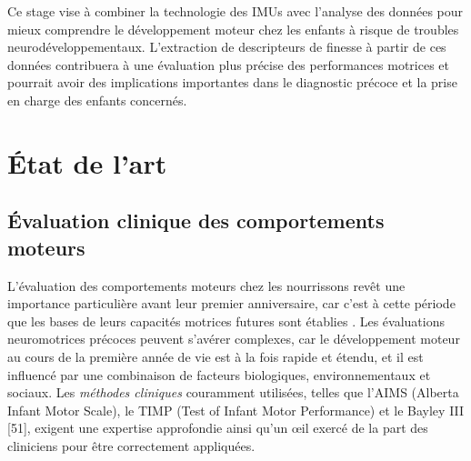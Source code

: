 \documentclass[5pt]{article}
\begin{document}
Ce stage vise à combiner la technologie des IMUs avec l'analyse des données pour mieux comprendre le développement moteur chez les enfants à risque de troubles neurodéveloppementaux. L'extraction de descripteurs de finesse à partir de ces données contribuera à une évaluation plus précise des performances motrices et pourrait avoir des implications importantes dans le diagnostic précoce et la prise en charge des enfants concernés.


\newpage
\section{État de l'art}
\subsection{Évaluation clinique des comportements moteurs}
\label{subsec: assess_sensor}

\par L'évaluation des comportements moteurs chez les nourrissons revêt une importance particulière avant leur premier anniversaire, car c'est à cette période que les bases de leurs capacités motrices futures sont établies \cite{adolph_physical_2005}.  Les évaluations neuromotrices précoces peuvent s'avérer complexes, car le développement moteur au cours de la première année de vie est à la fois rapide et étendu, et il est influencé par une combinaison de facteurs biologiques, environnementaux et sociaux. Les \textit{méthodes cliniques} couramment utilisées, telles que l'AIMS (Alberta Infant Motor Scale), le TIMP (Test of Infant Motor Performance) et le Bayley III [51], exigent une expertise approfondie ainsi qu'un œil exercé de la part des cliniciens pour être correctement appliquées.\\
\end{document}
